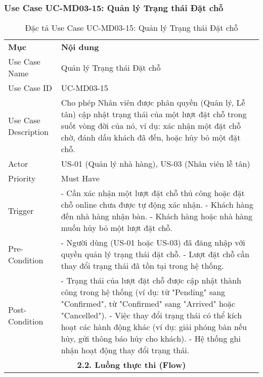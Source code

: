 \subsubsection{Use Case UC-MD03-15: Quản lý Trạng thái Đặt chỗ}

\begin{longtable}{|m{4cm}|p{11cm}|}
\caption{Đặc tả Use Case UC-MD03-15: Quản lý Trạng thái Đặt chỗ} \label{tab:uc_md03_15} \\
\hline

\endhead %
\hline
\endfoot %
\hline
\endlastfoot %
\multicolumn{2}{|c|}{\textbf{2.1. Tóm tắt (Summary)}} \\
\hline
\textbf{Mục} & \textbf{Nội dung} \\
\hline
Use Case Name & Quản lý Trạng thái Đặt chỗ \\
\hline
Use Case ID & UC-MD03-15 \\
\hline
Use Case Description & Cho phép Nhân viên được phân quyền (Quản lý, Lễ tân) cập nhật trạng thái của một lượt đặt chỗ trong suốt vòng đời của nó, ví dụ: xác nhận một đặt chỗ chờ, đánh dấu khách đã đến, hoặc hủy bỏ một đặt chỗ. \\
\hline
Actor & US-01 (Quản lý nhà hàng), US-03 (Nhân viên lễ tân) \\
\hline
Priority & Must Have \\
\hline
Trigger & - Cần xác nhận một lượt đặt chỗ thủ công hoặc đặt chỗ online chưa được tự động xác nhận. \newline - Khách hàng đến nhà hàng nhận bàn. \newline - Khách hàng hoặc nhà hàng muốn hủy bỏ một lượt đặt chỗ. \\
\hline
Pre-Condition & - Người dùng (US-01 hoặc US-03) đã đăng nhập với quyền quản lý trạng thái đặt chỗ. \newline - Lượt đặt chỗ cần thay đổi trạng thái đã tồn tại trong hệ thống. \\
\hline
Post-Condition & - Trạng thái của lượt đặt chỗ được cập nhật thành công trong hệ thống (ví dụ: từ "Pending" sang "Confirmed", từ "Confirmed" sang "Arrived" hoặc "Cancelled"). \newline - Việc thay đổi trạng thái có thể kích hoạt các hành động khác (ví dụ: giải phóng bàn nếu hủy, gửi thông báo hủy cho khách). \newline - Hệ thống ghi nhận hoạt động thay đổi trạng thái. \\
\hline
\multicolumn{2}{|c|}{\textbf{2.2. Luồng thực thi (Flow)}} \\

\end{longtable}
